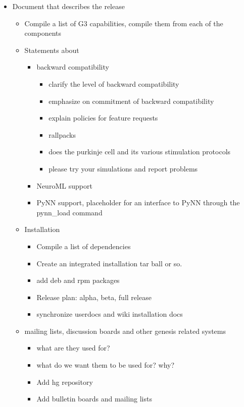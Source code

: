 \documentclass[12pt]{article}
\begin{document}
\begin{itemize}
\item Document that describes the release
  \begin{itemize}
  \item Compile a list of G3 capabilities, compile them from each of the components
  \item Statements about
    \begin{itemize}
    \item backward compatibility
      \begin{itemize}
      \item clarify the level of backward compatibility 
      \item emphasize on commitment of backward compatibility
      \item explain policies for feature requests
      \item rallpacks
      \item does the purkinje cell and its various stimulation protocols
      \item please try your simulations and report problems
      \end{itemize}
    \item NeuroML support
    \item PyNN support, placeholder for an interface to PyNN through the
      pynn\_load command
    \end{itemize}
  \item Installation
    \begin{itemize}
    \item Compile a list of dependencies
    \item Create an integrated installation tar ball or so.
    \item add deb and rpm packages
    \item Release plan: alpha, beta, full release
    \item synchronize userdocs and wiki installation docs
    \end{itemize}
  \item mailing lists, discussion boards and other genesis related systems
    \begin{itemize}
    \item what are they used for?
    \item what do we want them to be used for? why?
    \item Add hg repository
    \item Add bulletin boards and mailing lists

\end{itemize}
\end{itemize}
\end{itemize}
\end{document}
